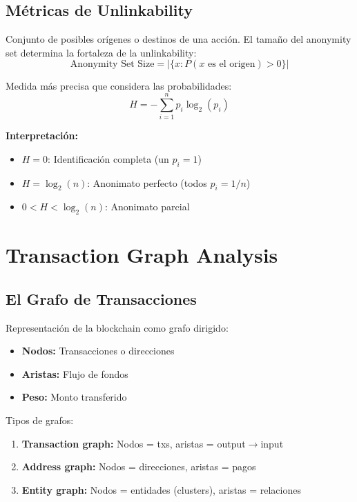 \documentclass[11pt,a4paper,twoside]{book}
\begin{document}
\subsection{M\'etricas de Unlinkability}

\begin{definition}
Conjunto de posibles or\'igenes o destinos de una acci\'on. El tama\~no del anonymity set determina la fortaleza de la unlinkability:
\[
\text{Anonymity Set Size} = |\{x : P(x \text{ es el origen}) > 0\}|
\]
\end{definition}

\begin{definition}
Medida m\'as precisa que considera las probabilidades:
\[
H = -\sum_{i=1}^{n} p_i \log_2(p_i)
\]

\textbf{Interpretaci\'on:}
\begin{itemize}
    \item $H = 0$: Identificaci\'on completa (un $p_i = 1$)
    \item $H = \log_2(n)$: Anonimato perfecto (todos $p_i = 1/n$)
    \item $0 < H < \log_2(n)$: Anonimato parcial
\end{itemize}
\end{definition}

\section{Transaction Graph Analysis}
\label{sec:graph-analysis}

\subsection{El Grafo de Transacciones}

\begin{definition}
Representaci\'on de la blockchain como grafo dirigido:
\begin{itemize}
    \item \textbf{Nodos:} Transacciones o direcciones
    \item \textbf{Aristas:} Flujo de fondos
    \item \textbf{Peso:} Monto transferido
\end{itemize}

Tipos de grafos:
\begin{enumerate}
    \item \textbf{Transaction graph:} Nodos = txs, aristas = output$\to$input
    \item \textbf{Address graph:} Nodos = direcciones, aristas = pagos
    \item \textbf{Entity graph:} Nodos = entidades (clusters), aristas = relaciones
\end{enumerate}
\end{definition}
\end{document}
